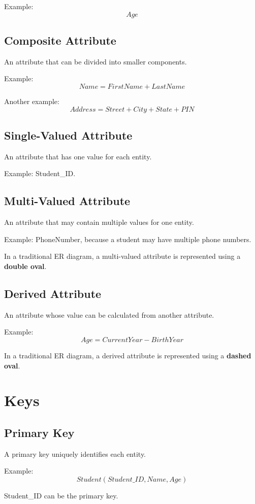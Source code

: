\documentclass[12pt,a4paper]{article}
\begin{document}
Example:
\[
Age
\]

\subsection{Composite Attribute}
An attribute that can be divided into smaller components.

Example:
\[
Name = FirstName + LastName
\]

Another example:
\[
Address = Street + City + State + PIN
\]

\subsection{Single-Valued Attribute}
An attribute that has one value for each entity.

Example: Student\_ID.

\subsection{Multi-Valued Attribute}
An attribute that may contain multiple values for one entity.

Example: PhoneNumber, because a student may have multiple phone numbers.

In a traditional ER diagram, a multi-valued attribute is represented using a \textbf{double oval}.

\subsection{Derived Attribute}
An attribute whose value can be calculated from another attribute.

Example:
\[
Age = CurrentYear - BirthYear
\]

In a traditional ER diagram, a derived attribute is represented using a \textbf{dashed oval}.

\section{Keys}

\subsection{Primary Key}
A primary key uniquely identifies each entity.

Example:
\[
Student(Student\_ID, Name, Age)
\]

Student\_ID can be the primary key.
\end{document}
